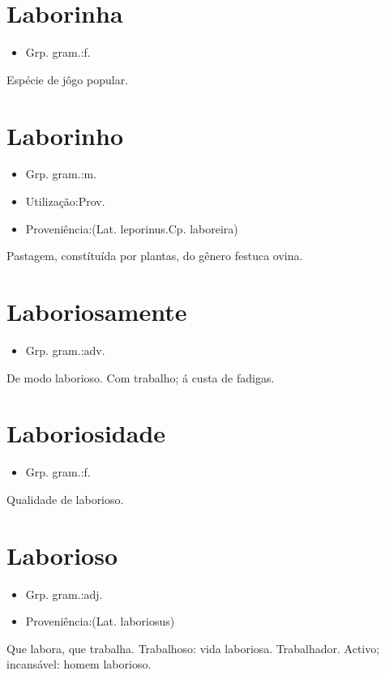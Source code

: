 \section{Laborinha}
\begin{itemize}
\item {Grp. gram.:f.}
\end{itemize}
Espécie de jôgo popular.
\section{Laborinho}
\begin{itemize}
\item {Grp. gram.:m.}
\end{itemize}
\begin{itemize}
\item {Utilização:Prov.}
\end{itemize}
\begin{itemize}
\item {Proveniência:(Lat. \textunderscore leporinus.\textunderscore  Cp. \textunderscore laboreira\textunderscore )}
\end{itemize}
Pastagem, constítuída por plantas, do gênero \textunderscore festuca ovina\textunderscore .
\section{Laboriosamente}
\begin{itemize}
\item {Grp. gram.:adv.}
\end{itemize}
De modo laborioso.
Com trabalho; á custa de fadigas.
\section{Laboriosidade}
\begin{itemize}
\item {Grp. gram.:f.}
\end{itemize}
Qualidade de laborioso.
\section{Laborioso}
\begin{itemize}
\item {Grp. gram.:adj.}
\end{itemize}
\begin{itemize}
\item {Proveniência:(Lat. \textunderscore laboriosus\textunderscore )}
\end{itemize}
Que labora, que trabalha.
Trabalhoso: \textunderscore vida laboriosa\textunderscore .
Trabalhador.
Activo; incansável: \textunderscore homem laborioso\textunderscore .

